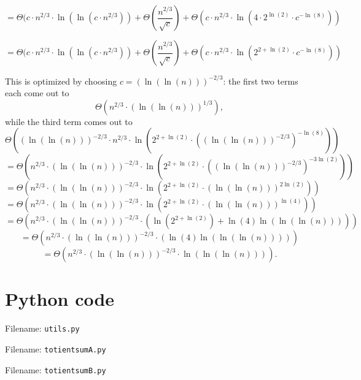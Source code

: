 \documentclass[12pt]{article}
\newcommand{\eqn}[1]{\begin{displaymath} #1 \end{displaymath}}
\newcommand{\floor}[1]{{\left\lfloor #1 \right\rfloor}}
\newcommand{\showcode}[1]{Filename: \texttt{#1.py} }
\newcommand{\isqrt}[1]{\floor{\sqrt{#1}}}
\begin{document}
\eqn{= \Theta( c \cdot n^{2/3} \cdot \ln(\ln(c \cdot n^{2/3})) + \Theta\left(\frac{n^{2/3}}{\sqrt{c}}\right) + \Theta \left( c \cdot n^{2/3} \cdot \ln\left( 4 \cdot 2^{\ln(2)} \cdot c^{-\ln(8)} \right)\right)}

\eqn{= \Theta( c \cdot n^{2/3} \cdot \ln(\ln(c \cdot n^{2/3})) + \Theta\left(\frac{n^{2/3}}{\sqrt{c}}\right) + \Theta \left( c \cdot n^{2/3} \cdot \ln\left( 2^{2+\ln(2)} \cdot c^{-\ln(8)} \right)\right)}

This is optimized by choosing $c = (\ln(\ln(n)))^{-2/3}$: the first two terms each come out to
\eqn{\Theta(n^{2/3} \cdot (\ln(\ln(n)))^{1/3}),}
while the third term comes out to
\eqn{\Theta\left( (\ln(\ln(n)))^{-2/3} \cdot n^{2/3} \cdot \ln\left(2^{2+\ln(2)} \cdot \left( (\ln(\ln(n)))^{-2/3} \right)^{-\ln(8)}\right) \right)}
\eqn{ = \Theta\left( n^{2/3} \cdot (\ln(\ln(n)))^{-2/3} \cdot \ln\left(2^{2+\ln(2)} \cdot \left( (\ln(\ln(n)))^{-2/3} \right)^{-3\ln(2)}\right) \right)}
\eqn{ = \Theta\left( n^{2/3} \cdot (\ln(\ln(n)))^{-2/3} \cdot \ln\left(2^{2+\ln(2)} \cdot (\ln(\ln(n)))^{2\ln(2)} \right) \right)}
\eqn{ = \Theta\left( n^{2/3} \cdot (\ln(\ln(n)))^{-2/3} \cdot \ln\left(2^{2+\ln(2)} \cdot (\ln(\ln(n)))^{\ln(4)} \right) \right)}
\eqn{ = \Theta\left( n^{2/3} \cdot (\ln(\ln(n)))^{-2/3} \cdot \left( \ln\left(2^{2+\ln(2)}\right) + \ln(4) \ln(\ln(\ln(n))) \right) \right)}
\eqn{ = \Theta\left( n^{2/3} \cdot (\ln(\ln(n)))^{-2/3} \cdot \left( \ln(4) \ln(\ln(\ln(n))) \right) \right)}
\eqn{ = \Theta\left( n^{2/3} \cdot (\ln(\ln(n)))^{-2/3} \cdot \ln(\ln(\ln(n))) \right).}

\todo


\section{Python code}


Filename: \texttt{utils.py}

Filename: \texttt{totientsumA.py}
%

Filename: \texttt{totientsumB.py}
%
\end{document}

